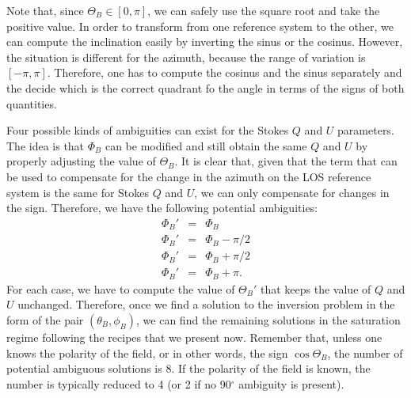\documentclass[12pt]{article}
\begin{document}
Note that, since $\Theta_B \in [0,\pi]$, we can safely use the square root and take the positive value.
In order to transform from one reference system to the other, we can compute the
inclination easily by inverting the sinus or the cosinus. However, the situation is different
for the azimuth, because the range of variation is $[-\pi,\pi]$. Therefore, one has to compute the 
cosinus and the sinus separately and the decide which is the correct quadrant fo the angle in terms
of the signs of both quantities.

% 

Four possible kinds of ambiguities can exist for the Stokes $Q$ and $U$ parameters. The idea is that $\Phi_B$
can be modified and still obtain the same $Q$ and $U$ by properly adjusting the value of $\Theta_B$. It is
clear that, given that the term that can be used to compensate for the change in the azimuth on the LOS
reference system is the same for Stokes $Q$ and $U$, we can only compensate for changes in the sign. Therefore,
we have the following potential ambiguities:
\begin{eqnarray}
\Phi_B' &=& \Phi_B \nonumber \\
\Phi_B' &=& \Phi_B -\pi/2 \nonumber \\
\Phi_B' &=& \Phi_B + \pi/2 \nonumber \\
\Phi_B' &=& \Phi_B + \pi.
\end{eqnarray}
For each case, we have to compute the value of $\Theta_B'$ that keeps the value of $Q$ and $U$ unchanged. Therefore,
once we find a solution to the inversion problem in the form of the pair $(\theta_B,\phi_B)$, we can find
the remaining solutions in the saturation regime following the recipes that we present now. Remember that, unless
one knows the polarity of the field, or in other words, the sign $\cos\Theta_B$, the number of potential
ambiguous solutions is 8. If the polarity of the field is known, the number is typically reduced to 4 (or 2
if no 90$^\circ$ ambiguity is present).
\end{document}
